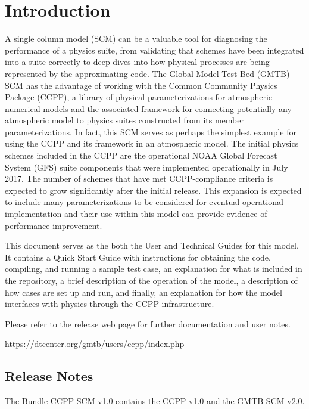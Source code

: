 \chapter{Introduction}
\label{chapter: introduction}
\setlength{\parskip}{12pt}

A single column model (SCM) can be a valuable tool for diagnosing the performance of a physics suite, from validating that schemes have been integrated into a suite correctly to deep dives into how physical processes are being represented by the approximating code. The Global Model Test Bed (GMTB) SCM has the advantage of working with the Common Community Physics Package (CCPP), a library of physical parameterizations for atmospheric numerical models and the associated framework for connecting potentially any atmospheric model to physics suites constructed from its member parameterizations. In fact, this SCM serves as perhaps the simplest example for using the CCPP and its framework in an atmospheric model. The initial physics schemes included in the CCPP are the operational NOAA Global Forecast System (GFS) suite components that were implemented operationally in July 2017. The number of schemes that have met CCPP-compliance criteria is expected to grow significantly after the initial release. This expansion is expected to include many parameterizations to be considered for eventual operational implementation and their use within this model can provide evidence of performance improvement.

This document serves as the both the User and Technical Guides for this model. It contains a Quick Start Guide with instructions for obtaining the code, compiling, and running a sample test case, an explanation for what is included in the repository, a brief description of the operation of the model, a description of how cases are set up and run, and finally, an explanation for how the model interfaces with physics through the CCPP infrastructure.

Please refer to the release web page for further documentation and user notes.

\url{https://dtcenter.org/gmtb/users/ccpp/index.php}

\section{Release Notes}

The Bundle CCPP-SCM v1.0 contains the CCPP v1.0 and the GMTB SCM v2.0.

